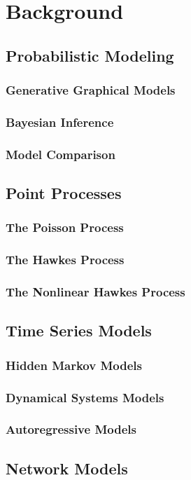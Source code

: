 
\chapter{Background}

\section{Probabilistic Modeling}

\subsection{Generative Graphical Models}

\subsection{Bayesian Inference}

\subsection{Model Comparison}


\section{Point Processes}

\subsection{The Poisson Process}

\subsection{The Hawkes Process}

\subsection{The Nonlinear Hawkes Process}


\section{Time Series Models}

\subsection{Hidden Markov Models}

\subsection{Dynamical Systems Models}

\subsection{Autoregressive Models}


\section{Network Models}